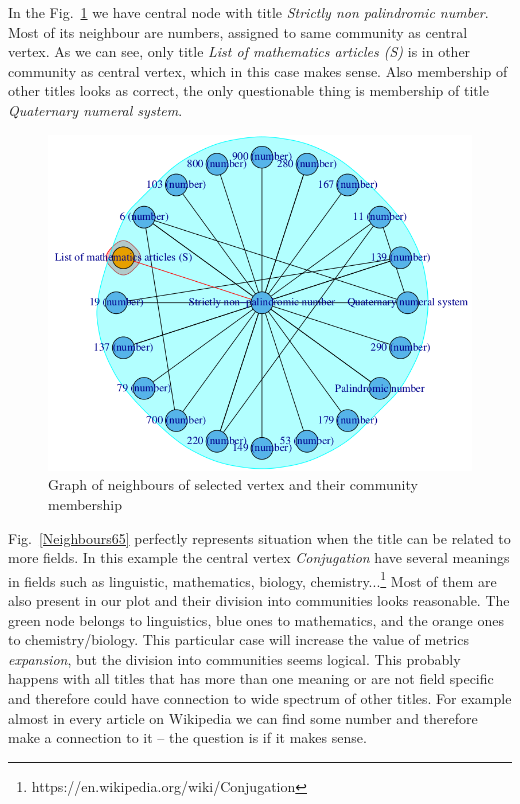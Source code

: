 \documentclass[paper=a4, fontsize=11pt]{scrartcl} %
\begin{document}
In the Fig.~\ref{Neighbours60} we have central node with title \textit{Strictly non palindromic number}. Most of its neighbour are numbers, assigned to same community as central vertex. As we can see, only title \textit{List of mathematics articles (S)} is in other community as central vertex, which in this case makes sense. Also membership of other titles looks as correct, the only questionable thing is membership of title \textit{Quaternary numeral system}.

\begin{figure}
	\centering
	\includegraphics[scale=0.4,keepaspectratio]{Neighbours60}
	\caption{Graph of neighbours of selected vertex and their community membership}
	\label{Neighbours60}
\end{figure}

Fig.~\ref{Neighbours65} perfectly represents situation when the title can be related to more fields. In this example the central vertex \textit{Conjugation} have several meanings in fields such as linguistic, mathematics, biology, chemistry...\footnote{https://en.wikipedia.org/wiki/Conjugation} Most of them are also present in our plot and their division into communities looks reasonable. The green node belongs to linguistics, blue ones to mathematics, and the orange ones to chemistry/biology. This particular case will increase the value of metrics \textit{expansion}, but the division into communities seems logical. This probably happens with all titles that has more than one meaning or are not field specific and therefore could have connection to wide spectrum of other titles. For example almost in every article on Wikipedia we can find some number and therefore make a connection to it -- the question is if it makes sense.
\end{document}
